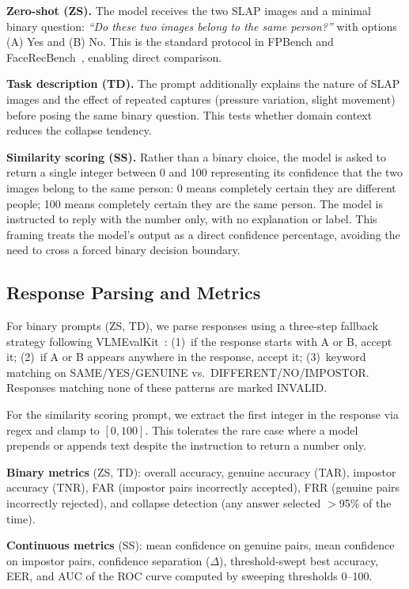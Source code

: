 \documentclass[journal]{IEEEtran}
\begin{document}
\textbf{Zero-shot (ZS).}
The model receives the two SLAP images and a minimal binary question:
\textit{``Do these two images belong to the same person?''} with
options (A) Yes and (B) No.
This is the standard protocol in FPBench and
FaceRecBench~\cite{fpbench2025,facerecbench2025}, enabling direct
comparison.

\textbf{Task description (TD).}
The prompt additionally explains the nature of SLAP images and the
effect of repeated captures (pressure variation, slight movement)
before posing the same binary question.
This tests whether domain context reduces the collapse tendency.

\textbf{Similarity scoring (SS).}
Rather than a binary choice, the model is asked to return a single
integer between 0 and 100 representing its confidence that the two
images belong to the same person: 0 means completely certain they are
different people; 100 means completely certain they are the same person.
The model is instructed to reply with the number only, with no
explanation or label.
This framing treats the model's output as a direct confidence
percentage, avoiding the need to cross a forced binary decision boundary.

\subsection{Response Parsing and Metrics}

For binary prompts (ZS, TD), we parse responses using a
three-step fallback strategy following VLMEvalKit~\cite{vlmevalkit}:
(1)~if the response starts with A or B, accept it;
(2)~if A or B appears anywhere in the response, accept it;
(3)~keyword matching on SAME/YES/GENUINE vs.\ DIFFERENT/NO/IMPOSTOR.
Responses matching none of these patterns are marked INVALID.

For the similarity scoring prompt, we extract the first integer in the
response via regex and clamp to $[0, 100]$. This tolerates the rare
case where a model prepends or appends text despite the instruction
to return a number only.

\textbf{Binary metrics} (ZS, TD):
overall accuracy, genuine accuracy (TAR), impostor accuracy (TNR),
FAR (impostor pairs incorrectly accepted), FRR (genuine pairs
incorrectly rejected), and collapse detection (any answer selected
$>$95\% of the time).

\textbf{Continuous metrics} (SS):
mean confidence on genuine pairs, mean confidence on impostor pairs,
confidence separation ($\Delta$), threshold-swept best accuracy, EER,
and AUC of the ROC curve computed by sweeping thresholds 0--100.
\end{document}
